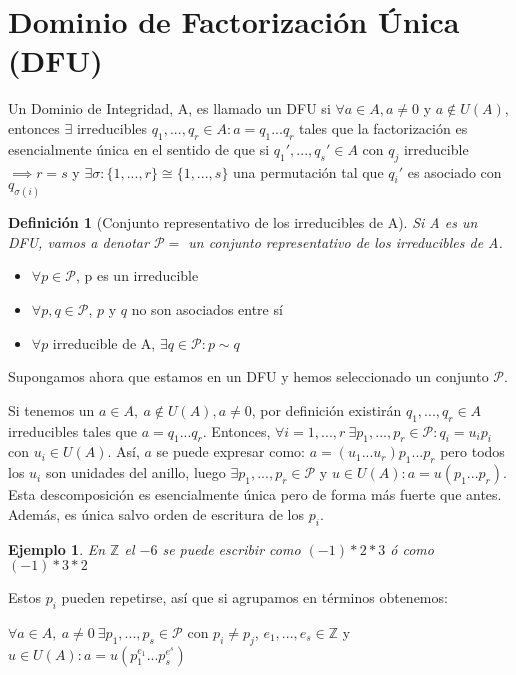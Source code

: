 \documentclass[11pt, a4paper, titlepage]{article}
\newif\IfInSansMode
\providecommand{\ent}{\mathbb{Z}}
\theoremstyle{theorem-style}
\theoremstyle{definition-style}
\newtheorem{ndef}{Definición}[section]
\theoremstyle{remark-style}
\theoremstyle{example-style}
\newtheorem{ejemplo}{Ejemplo}[section]
\begin{document}
\section{Dominio de Factorización Única (DFU)}

Un Dominio de Integridad, A, es llamado un DFU si $\forall a \in A, a\ne 0$ y $a\notin U(A)$, entonces $\exists$ irreducibles $q_1 ,...,q_r \in A : a = q_1 ...q_r$ tales que la factorización es esencialmente única en el sentido de que si $q_1' ,...,q_s' \in A $ con $q_j$ irreducible $\implies r = s$ y $\exists \sigma:\{1,...,r\} \cong \{1,...,s\}$ una permutación tal que $q_i'$ es asociado con $q_{\sigma(i)}$

\begin{ndef}[Conjunto representativo de los irreducibles de A]
	Si A es un DFU, vamos a denotar $\mathcal{P}= $ un conjunto representativo de los irreducibles de A.
\end{ndef}

\begin{itemize}
\item $\forall p \in \mathcal{P}$, p es un irreducible
\item $\forall p, q \in \mathcal{P}$, $p$ y $q$ no son asociados entre sí
\item $\forall p $ irreducible de A, $\exists q \in \mathcal{P} : p \sim q$
\end{itemize}

Supongamos ahora que estamos en un DFU y hemos seleccionado un conjunto $\mathcal{P}$.

Si tenemos un $a\in A,\ a \notin U(A), a \ne 0$, por definición existirán $q_1 ,...,q_r \in A $ irreducibles tales que $a = q_1...q_r $. Entonces, $\forall i = 1,...,r\ \exists p_1,...,p_r \in \mathcal{P} : q_i = u_ip_i $ con $u_i \in U(A)$. Así, $a$ se puede expresar como: $a = (u_1...u_r)p_1...p_r$ pero todos los $u_i$ son unidades del anillo, luego $\exists p_1,...,p_r \in \mathcal{P} $ y $u \in U(A) : a = u(p_1...p_r)$. Esta descomposición es esencialmente única pero de forma más fuerte que antes. Además, es única salvo orden de escritura de los $p_i$.

\begin{ejemplo}
	En $\ent$ el $-6$ se puede escribir como $(-1)*2*3$ ó como $(-1)*3*2$
\end{ejemplo}

Estos $p_i$ pueden repetirse, así que si agrupamos en términos obtenemos:

$\forall a \in A,\ a \ne 0\ \exists p_1,...,p_s \in \mathcal{P}$ con $p_i \ne p_j$, $e_1,...,e_s \in \ent$ y $ u \in U(A) : a = u(p_1^{e_1}...p_s^{e^s})$
\end{document}
